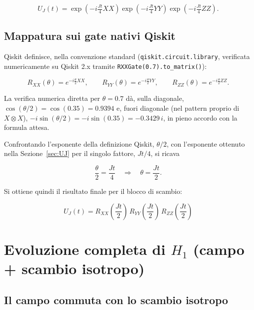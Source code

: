 \documentclass[11pt,a4paper]{article}
\begin{document}
\begin{equation}
U_J(t) = \exp\!\left(-i\tfrac{Jt}{4}XX\right)\exp\!\left(-i\tfrac{Jt}{4}YY\right)\exp\!\left(-i\tfrac{Jt}{4}ZZ\right).
\end{equation}

\subsection{Mappatura sui gate nativi Qiskit}

Qiskit definisce, nella convenzione standard (\texttt{qiskit.circuit.library}, verificata numericamente su Qiskit 2.x tramite \texttt{RXXGate(0.7).to\_matrix()}):

\begin{equation}
R_{XX}(\theta) = e^{-i\frac{\theta}{2}XX}, \qquad R_{YY}(\theta) = e^{-i\frac{\theta}{2}YY}, \qquad R_{ZZ}(\theta) = e^{-i\frac{\theta}{2}ZZ}.
\end{equation}

La verifica numerica diretta per $\theta=0.7$ dà, sulla diagonale, $\cos(\theta/2)=\cos(0.35)=0.9394$ e, fuori diagonale (nel pattern proprio di $X\otimes X$), $-i\sin(\theta/2)=-i\sin(0.35)=-0.3429\,i$, in pieno accordo con la formula attesa.

Confrontando l'esponente della definizione Qiskit, $\theta/2$, con l'esponente ottenuto nella Sezione~\ref{sec:UJ} per il singolo fattore, $Jt/4$, si ricava

\begin{equation}
\frac{\theta}{2} = \frac{Jt}{4} \quad\Longrightarrow\quad \theta = \frac{Jt}{2}.
\end{equation}

Si ottiene quindi il risultato finale per il blocco di scambio:

\begin{equation}
\boxed{U_J(t) = R_{XX}\!\left(\frac{Jt}{2}\right)\,R_{YY}\!\left(\frac{Jt}{2}\right)\,R_{ZZ}\!\left(\frac{Jt}{2}\right)}
\end{equation}

\section{Evoluzione completa di $H_1$ (campo + scambio isotropo)}
\label{sec:H1}

\subsection{Il campo commuta con lo scambio isotropo}
\end{document}

